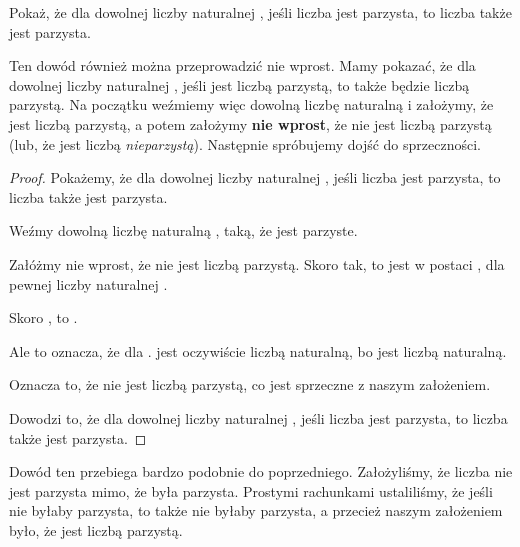 \begin{example}
\label{example:even-square}
Pokaż, że dla dowolnej liczby naturalnej , jeśli liczba  jest parzysta, to liczba  także jest parzysta.

Ten dowód również można przeprowadzić nie wprost. Mamy pokazać, że dla dowolnej liczby naturalnej , jeśli  jest liczbą parzystą, to  także będzie liczbą parzystą. Na początku weźmiemy więc dowolną liczbę naturalną  i założymy, że  jest liczbą parzystą, a potem założymy \textbf{nie wprost}, że  nie jest liczbą parzystą (lub, że jest liczbą \textit{nieparzystą}). Następnie spróbujemy dojść do sprzeczności.

\begin{proof} Pokażemy, że dla dowolnej liczby naturalnej , jeśli liczba  jest parzysta, to liczba  także jest parzysta.

Weźmy dowolną liczbę naturalną , taką, że  jest parzyste.

Załóżmy nie wprost, że  nie jest liczbą parzystą. Skoro tak, to  jest w postaci , dla pewnej liczby naturalnej .

Skoro , to . 

Ale to oznacza, że  dla .  jest oczywiście liczbą naturalną, bo  jest liczbą naturalną.

Oznacza to, że  nie jest liczbą parzystą, co jest sprzeczne z naszym założeniem.

Dowodzi to, że dla dowolnej liczby naturalnej , jeśli liczba  jest parzysta, to liczba  także jest parzysta.
\end{proof}

Dowód ten przebiega bardzo podobnie do poprzedniego. Założyliśmy, że liczba  nie jest parzysta mimo, że  była parzysta. Prostymi rachunkami ustaliliśmy, że jeśli  nie byłaby parzysta, to  także nie byłaby parzysta, a przecież naszym założeniem było, że  jest liczbą parzystą.
\end{example}

